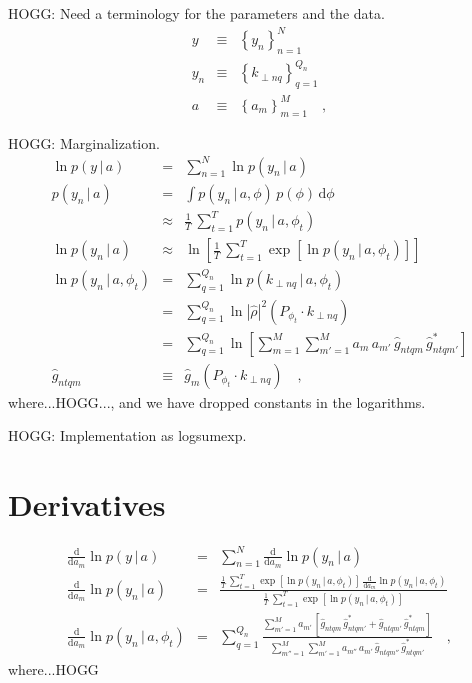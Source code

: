 \documentclass[12pt]{article}
\newcommand{\setof}[1]{\left\{{#1}\right\}}
\newcommand{\given}{\,|\,}
\newcommand{\dd}{\mathrm{d}}
\begin{document}
HOGG: Need a terminology for the parameters and the data.
\begin{eqnarray}
  y &\equiv& \setof{y_n}_{n=1}^N
  \\
  y_n &\equiv& \setof{k_{\perp nq}}_{q=1}^{Q_n}
  \\
  a &\equiv& \setof{a_m}_{m=1}^M
  \quad,
\end{eqnarray}

HOGG: Marginalization.
\begin{eqnarray}
  \ln p(y\given a) &=& \sum_{n=1}^N \ln p(y_n\given a)
  \\
  p(y_n\given a) &=& \int p(y_n\given a,\phi)\,p(\phi)\,\dd\phi
  \\
  &\approx& \frac{1}{T}\,\sum_{t=1}^T p(y_n\given a,\phi_t)
  \\
  \ln p(y_n\given a) &\approx& \ln\left[\frac{1}{T}\,\sum_{t=1}^T \exp\left[\ln p(y_n\given a,\phi_t)\right]\right]
  \\
  \ln p(y_n\given a,\phi_t) &=& \sum_{q=1}^{Q_n} \ln p(k_{\perp nq}\given a,\phi_t)
  \\
  &=& \sum_{q=1}^{Q_n} \ln |\hat{\rho}|^2(P_{\phi_t}\cdot k_{\perp nq})
  \\
  &=& \sum_{q=1}^{Q_n} \ln\left[ \sum_{m=1}^M\sum_{m'=1}^M a_m\,a_{m'}\,\hat{g}_{ntqm}\,\hat{g}_{ntqm'}^{\ast} \right]
  \\
  \hat{g}_{ntqm} &\equiv& \hat{g}_m(P_{\phi_t}\cdot k_{\perp nq})
  \quad,
\end{eqnarray}
where...HOGG..., and we
have dropped constants in the logarithms.

HOGG: Implementation as logsumexp.

\section{Derivatives}

\begin{eqnarray}
  \frac{\dd}{\dd a_m}\ln p(y\given a) &=& \sum_{n=1}^N \frac{\dd}{\dd a_m}\ln p(y_n\given a)
  \\
  \frac{\dd}{\dd a_m}\ln p(y_n\given a)
    &=& \frac{\displaystyle
      \frac{1}{T}\,\sum_{t=1}^T \exp\left[\ln p(y_n\given a,\phi_t)\right]\,\frac{\dd}{\dd a_m}\ln p(y_n\given a,\phi_t)}%
             {\displaystyle
      \frac{1}{T}\,\sum_{t=1}^T \exp\left[\ln p(y_n\given a,\phi_t)\right]}
  \\
  \frac{\dd}{\dd a_m}\ln p(y_n\given a,\phi_t)
    &=& \sum_{q=1}^{Q_n} \frac{\displaystyle
      \sum_{m'=1}^M a_{m'}\,\left[\hat{g}_{ntqm}\,\hat{g}_{ntqm'}^{\ast}+\hat{g}_{ntqm'}\,\hat{g}_{ntqm}^{\ast}\right]}%
             {\displaystyle
      \sum_{m''=1}^M\sum_{m'=1}^M a_{m''}\,a_{m'}\,\hat{g}_{ntqm''}\,\hat{g}_{ntqm'}^{\ast}}
  \quad,
\end{eqnarray}
where...HOGG
\end{document}
